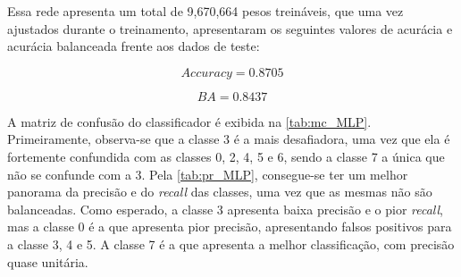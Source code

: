 	Essa rede apresenta um total de 9,670,664 pesos treináveis, que uma vez ajustados durante o treinamento, apresentaram os seguintes valores de acurácia e acurácia balanceada frente aos dados de teste:

\begin{equation}\label{eq:acc_MLP}
	Accuracy = 0.8705
\end{equation}

\begin{equation}\label{eq:ba_MLP}
	BA = 0.8437
\end{equation}

	A matriz de confusão do classificador é exibida na \autoref{tab:mc_MLP}. Primeiramente, observa-se que a classe 3 é a mais desafiadora, uma vez que ela é fortemente confundida com as classes 0, 2, 4, 5 e 6, sendo a classe 7 a única que não se confunde com a 3. Pela \autoref{tab:pr_MLP}, consegue-se ter um melhor panorama da precisão e do \textit{recall} das classes, uma vez que as mesmas não são balanceadas. Como esperado, a classe 3 apresenta baixa precisão e o pior \textit{recall}, mas a classe 0 é a que apresenta pior precisão, apresentando falsos positivos para a classe 3, 4 e 5. A classe 7 é a que apresenta a melhor classificação, com precisão quase unitária.


